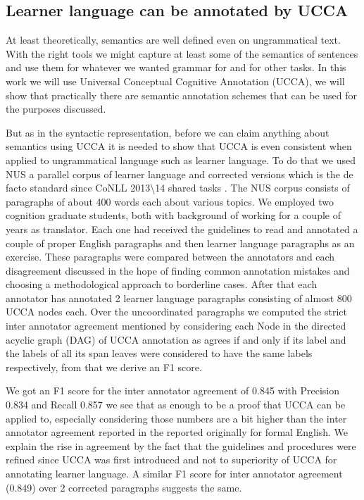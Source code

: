 \documentclass[english]{article}
\begin{document}
\subsection{Learner language can be annotated by UCCA}

At least theoretically, semantics are well defined even on ungrammatical
text. With the right tools we might capture at least some of the semantics
of sentences and use them for whatever we wanted grammar for and for
other tasks. In this work we will use Universal Conceptual Cognitive
Annotation (UCCA)\cite{abend2013universal}, we will show that practically
there are semantic annotation schemes that can be used for the purposes
discussed.

But as in the syntactic representation, before we can claim anything
about semantics using UCCA it is needed to show that UCCA is even
consistent when applied to ungrammatical language such as learner
language. To do that we used NUS\cite{dahlmeier2013building} a parallel
corpus of learner language and corrected versions which is the de
facto standard since CoNLL 2013\textbackslash{}14 shared tasks \cite{kao2013conll,ng2014conll}.
The NUS corpus consists of paragraphs of about 400 words each about
various topics. We employed two cognition graduate students, both
with background of working for a couple of years as translator. Each
one had received the guidelines to read and annotated a couple of
proper English paragraphs and then learner language paragraphs as
an exercise. These paragraphs were compared between the annotators
and each disagreement discussed in the hope of finding common annotation
mistakes and choosing a methodological approach to borderline cases.
After that each annotator has annotated 2 learner language paragraphs
consisting of almost 800 UCCA nodes each. Over the uncoordinated paragraphs
we computed the strict inter annotator agreement mentioned by \cite{abend2013universal}
considering each Node in the directed acyclic graph (DAG) of UCCA
annotation as agrees if and only if its label and the labels of all
its span leaves were considered to have the same labels respectively,
from that we derive an F1 score. 

We got an F1 score for the inter annotator agreement of 0.845 with
Precision 0.834 and Recall 0.857 we see that as enough to be a proof
that UCCA can be applied to, especially considering those numbers
are a bit higher than the inter annotator agreement reported in the
reported originally for formal English\cite{abend2013universal}.
We explain the rise in agreement by the fact that the guidelines and
procedures were refined since UCCA was first introduced and not to
superiority of UCCA for annotating learner language. A similar F1
score for inter annotator agreement (0.849) over 2 corrected paragraphs
suggests the same.
\end{document}
